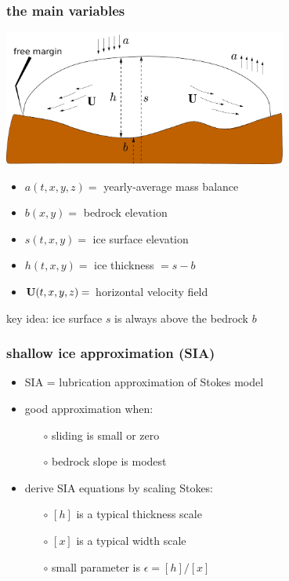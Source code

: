 \documentclass{beamer}
\newcommand{\eps}{\epsilon}
\begin{document}
\begin{frame}
  \frametitle{the main variables}

\begin{center}
\includegraphics[width=0.7\textwidth]{groundedscheme}
\end{center}

\begin{itemize}
\small
\item $a(t,x,y,z)=$ yearly-average mass balance
\item $b(x,y)=$ bedrock elevation
\item $s(t,x,y)=$ ice surface elevation
\item $h(t,x,y)=$ ice thickness $ = s-b$
\item ${\bf U}(t,x,y,z)=$ horizontal velocity field
\end{itemize}

\begin{alertblock}{key idea: ice surface $s$ is always above the bedrock $b$}
\end{alertblock}
\end{frame}


\begin{frame}
  \frametitle{shallow ice approximation (SIA)}

\begin{itemize}
\item SIA = lubrication approximation of Stokes model
\item good approximation when:
  \begin{itemize}
  \item[$\circ$] sliding is small or zero
  \item[$\circ$] bedrock slope is modest
  \end{itemize}
\item derive SIA equations by scaling Stokes:
  \begin{itemize}
  \item[$\circ$] $[h]$ is a typical thickness scale
  \item[$\circ$] $[x]$ is a typical width scale
  \item[$\circ$] small parameter is $\eps = [h] / [x]$
  \end{itemize}
\end{itemize}
\end{frame}
\end{document}

